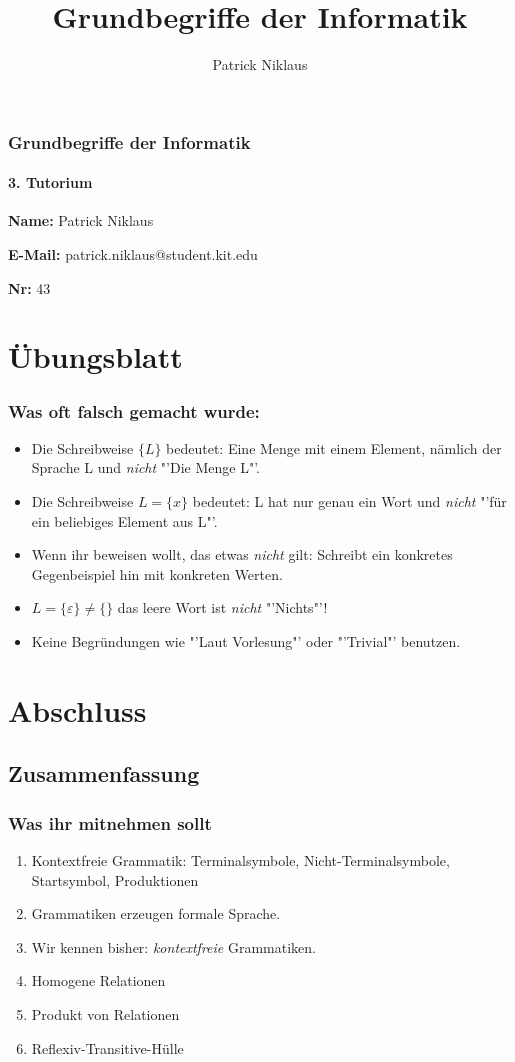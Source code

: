 \documentclass{beamer}
\title{Grundbegriffe der Informatik}
\author{Patrick Niklaus}
\begin{document}
\begin{frame}
  \frametitle{Grundbegriffe der Informatik}
  \framesubtitle{3. Tutorium}
  \begin{description}
    \item \textbf{Name:} Patrick Niklaus
    \item \textbf{E-Mail:} patrick.niklaus@student.kit.edu
    \item \textbf{Nr:} 43
  \end{description}
\end{frame}

\section{Übungsblatt}
\begin{frame}
  \frametitle{Was oft falsch gemacht wurde:}
  \begin{itemize}
    \item Die Schreibweise $\{L\}$ bedeutet: Eine Menge mit einem Element, nämlich der Sprache L und \emph{nicht} "'Die Menge L"'.
    \item Die Schreibweise $L = \{x\}$ bedeutet: L hat nur genau ein Wort und \emph{nicht} "'für ein beliebiges Element aus L"'.
    \item Wenn ihr beweisen wollt, das etwas \emph{nicht} gilt: Schreibt ein konkretes Gegenbeispiel hin mit konkreten Werten.
    \item $L = \{\varepsilon\} \ne \{\}$ das leere Wort ist \emph{nicht} "'Nichts"'!
    \item Keine Begründungen wie "'Laut Vorlesung"' oder "'Trivial"' benutzen.
  \end{itemize}
\end{frame}




\section{Abschluss}
\subsection{Zusammenfassung}
\begin{frame}
  \frametitle{Was ihr mitnehmen sollt}
  \begin{enumerate}
    \item Kontextfreie Grammatik: Terminalsymbole, Nicht-Terminalsymbole, Startsymbol, Produktionen
    \item Grammatiken erzeugen formale Sprache.
    \item Wir kennen bisher: \emph{kontextfreie} Grammatiken.
    \item Homogene Relationen
    \item Produkt von Relationen
    \item Reflexiv-Transitive-Hülle
  \end{enumerate}
\end{frame}
\end{document}
